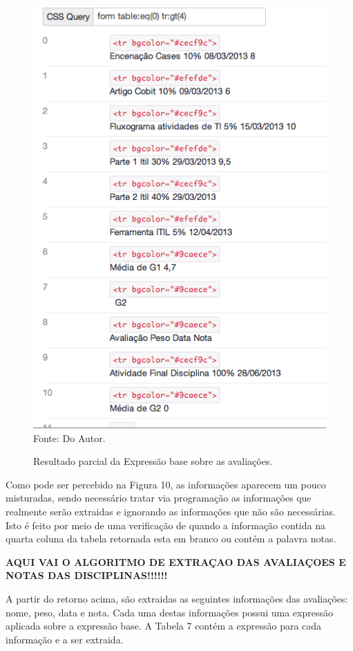 \begin{figure}[!htb]
     \centering
     \caption[Extração de Informações - Resultado parcial Avaliações]{Resultado parcial da Expressão base sobre as avaliações.}
     \includegraphics[scale=0.5]{imagens/avaliacoesdisciplinas1.png}
     \\  Fonte: Do Autor.
\end{figure}

Como pode ser percebido na Figura 10, as informações aparecem um pouco misturadas, sendo necessário tratar via programação as informações que realmente serão extraidas e ignorando as informações que não são necessárias. Isto é feito por meio de uma verificação de quando a informação contida na quarta coluna da tabela retornada esta em branco ou contém a palavra notas.

\textbf{AQUI VAI O ALGORITMO DE EXTRAÇAO DAS AVALIAÇOES E NOTAS DAS DISCIPLINAS!!!!!!}

A partir do retorno acima, são extraidas as seguintes informações das avaliações: nome, peso, data e nota. Cada uma destas informações possui uma expressão aplicada sobre a expressão base. A Tabela 7 contém a expressão para cada informação e a ser extraida.

